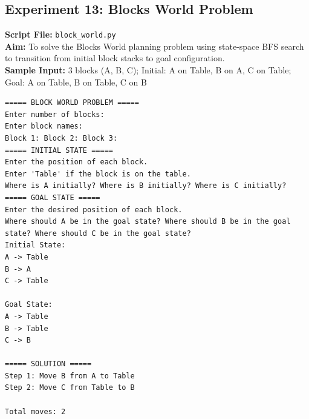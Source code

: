 \subsection*{Experiment 13: Blocks World Problem}
\textbf{Script File:} \texttt{block_world.py} \\[4pt]
\textbf{Aim:} To solve the Blocks World planning problem using state-space BFS search to transition from initial block stacks to goal configuration. \\[4pt]
\textbf{Sample Input:} 3 blocks (A, B, C); Initial: A on Table, B on A, C on Table; Goal: A on Table, B on Table, C on B \\[6pt]
\begin{tcolorbox}[colback=black!5!white,colframe=black!75!white,title=Terminal Execution Output - Blocks World Problem]
\begin{verbatim}
===== BLOCK WORLD PROBLEM =====
Enter number of blocks: 
Enter block names:
Block 1: Block 2: Block 3: 
===== INITIAL STATE =====
Enter the position of each block.
Enter 'Table' if the block is on the table.
Where is A initially? Where is B initially? Where is C initially? 
===== GOAL STATE =====
Enter the desired position of each block.
Where should A be in the goal state? Where should B be in the goal state? Where should C be in the goal state? 
Initial State:
A -> Table
B -> A
C -> Table

Goal State:
A -> Table
B -> Table
C -> B

===== SOLUTION =====
Step 1: Move B from A to Table
Step 2: Move C from Table to B

Total moves: 2
\end{verbatim}
\end{tcolorbox}


